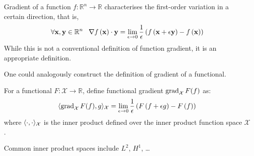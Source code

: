 \documentclass[../dissertation.tex]{subfiles}
\begin{document}
Gradient of a function $f:\mathbb{R}^n \rightarrow \mathbb{R}$ characterises the first-order variation in a certain direction,
that is,
\begin{equation}
    \forall \mathbf{x}, \mathbf{y} \in \mathbb{R}^n \; \; \;
    \nabla f \left( \mathbf{x} \right) \cdot \mathbf{y} = \lim_{\epsilon \rightarrow 0} \frac{1}{\epsilon} \left( f\left( \mathbf{x} + \epsilon \mathbf{y} \right) - f\left( \mathbf{x} \right)  \right) 
\end{equation}
While this is not a conventional definition of function gradient, it is an appropriate definition.

One could analogously construct the definition of gradient of a functional.
\begin{definition}
    For a functional $F:\mathcal{X} \rightarrow \mathbb{R}$, define functional gradient $\operatorname{grad}_{\mathcal{X}} F (f)$ as:
    \begin{equation}
        \langle \operatorname{grad}_{\mathcal{X}} F (f), g \rangle_{\mathcal{X}} = \lim_{\epsilon \rightarrow 0} \frac{1}{\epsilon} \left( F\left( f + \epsilon g \right) - F\left( f \right) \right)
    \end{equation}
    where $\langle \cdot, \cdot \rangle_{\mathcal{X}}$ is the inner product defined over the inner product function space $\mathcal{X}$.
\end{definition}

Common inner product spaces include $L^2$, $H^1$, \ldots
\end{document}
